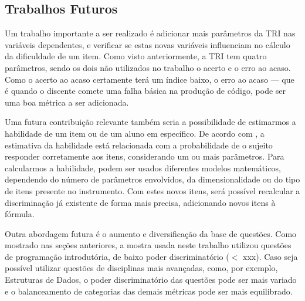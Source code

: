 \documentclass[12pt]{article}
\begin{document}
\subsection{Trabalhos Futuros}

Um trabalho importante a ser realizado é adicionar mais parâmetros da TRI nas variáveis dependentes, e verificar se estas novas variáveis influenciam no cálculo da dificuldade de um item. Como visto anteriormente, a TRI tem quatro parâmetros, sendo os dois não utilizados no trabalho o acerto e o erro ao acaso. Como o acerto ao acaso certamente terá um índice baixo, o erro ao acaso --- que é quando o discente comete uma falha básica na produção de código, pode ser uma boa métrica a ser adicionada.

Uma futura contribuição relevante também seria a possibilidade de estimarmos a habilidade de um item ou de um aluno em específico. De acordo com \cite{Liz2020}, a estimativa da habilidade está relacionada com a probabilidade de o sujeito responder corretamente aos itens, considerando um ou mais parâmetros. Para calcularmos a habilidade, podem ser usados diferentes modelos matemáticos, dependendo do 
número de parâmetros envolvidos, da dimensionalidade ou do tipo de itens presente no instrumento. Com estes novos itens, será possível recalcular a discriminação já existente de forma mais precisa, adicionando novos itens à fórmula. 

Outra abordagem futura é o aumento e diversificação da base de questões. Como mostrado nas seções anteriores, a mostra usada neste trabalho utilizou questões de programação introdutória, de baixo poder discriminatório ($<$ xxx). Caso seja possível utilizar questões de disciplinas mais avançadas, como, por exemplo, Estruturas de Dados, o poder discriminatório das questões pode ser mais variado e o balanceamento de categorias das demais métricas pode ser mais equilibrado.





\end{document}
